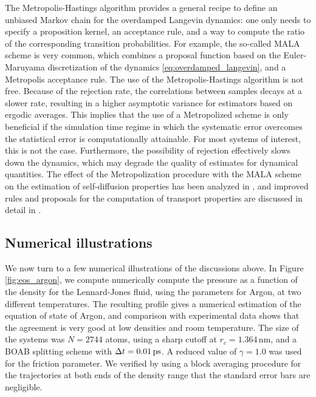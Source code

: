     \begin{remark}
    The Metropolis-Hastings algorithm provides a general recipe to define an unbiased Markov chain for the overdamped Langevin dynamics: one only needs to specify a proposition kernel, an acceptance rule, and a way to compute the ratio of the corresponding transition probabilities.
    For example, the so-called MALA scheme is very common, which combines a proposal function based on the Euler-Maruyama discretization of the dynamics \eqref{eq:overdamped_langevin}, and a Metropolis acceptance rule.
    The use of the Metropolis-Hastings algorithm is not free. Because of the rejection rate, the correlations between samples decays at a slower rate, resulting in a higher asymptotic variance for estimators based on ergodic averages.
    This implies that the use of a Metropolized scheme is only beneficial if the simulation time regime in which the systematic error overcomes the statistical error is computationally attainable. 
    For most systems of interest, this is not the case.
    Furthermore, the possibility of rejection effectively slows down the dynamics, which may degrade the quality of estimates for dynamical quantities.
    The effect of the Metropolization procedure with the MALA scheme on the estimation of self-diffusion properties has been analyzed in \cite{FHG15}, and improved rules and proposals for the computation of transport properties are discussed in detail in \cite{FG16}. 
    \end{remark}

    \subsection{Numerical illustrations}
    We now turn to a few numerical illustrations of the discussions above.
    In Figure \ref{fig:eos_argon}, we compute numerically compute the pressure as a function of the density for the Lennard-Jones fluid, using the parameters for Argon, at two different temperatures. 
    The resulting profile gives a numerical estimation of the equation of state of Argon, and comparison with experimental data shows that the agreement is very good at low densities and room temperature.
    The size of the systems was $N=2744$ atoms, using a sharp cutoff at $r_c=1.364\,\mathrm{nm}$, and a BOAB splitting scheme with ${\Delta t}=0.01\,\mathrm{ps}$. A reduced value of $\gamma=1.0$ was used for the friction parameter.
    We verified by using a block averaging procedure for the trajectories at both ends of the density range that the standard error bars are negligible.

